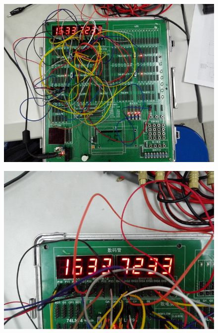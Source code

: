 \documentclass{article}
\begin{document}
\begin{figure}[!hbp]
  \centering
  \includegraphics[scale=0.5]{IMG_20170503_083818.jpg}
\end{figure}

\begin{figure}[!hbp]
  \centering
  \includegraphics[scale=0.5]{IMG_20170503_083819.jpg}
\end{figure}
\end{document}
